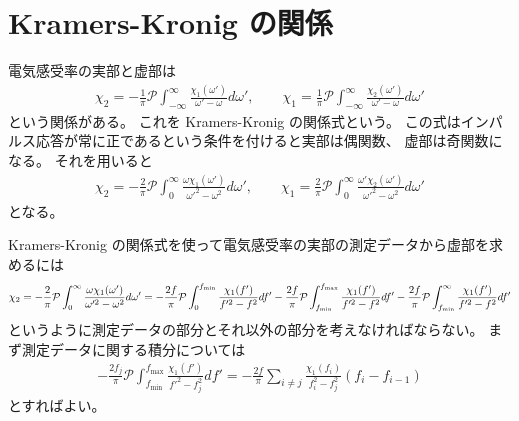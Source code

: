 \documentclass[9pt,dvipdfmx,a4paper]{jsarticle}
\begin{document}


\nocite{*}

\appendix
\section{Kramers-Kronig の関係}
電気感受率の実部と虚部は
\begin{align}
    \chi_2 = -\frac{1}{\pi}\mathcal{P}\int_{-\infty}^{\infty} \frac{\chi_1(\omega')}{\omega'-\omega} d\omega',\qquad
    \chi_1 =  \frac{1}{\pi}\mathcal{P}\int_{-\infty}^{\infty} \frac{\chi_2(\omega')}{\omega'-\omega} d\omega'
\end{align}
という関係がある。
これを Kramers-Kronig の関係式という。
この式はインパルス応答が常に正であるという条件を付けると実部は偶関数、
虚部は奇関数になる。
それを用いると
\begin{align}
    \chi_2 = -\frac{2}{\pi}\mathcal{P}\int_{0}^{\infty} \frac{\omega \chi_1(\omega')}{\omega'^2-\omega^2} d\omega',\qquad
    \chi_1 =  \frac{2}{\pi}\mathcal{P}\int_{0}^{\infty} \frac{\omega'\chi_2(\omega')}{\omega'^2-\omega^2} d\omega'
\end{align}
となる。

Kramers-Kronig の関係式を使って電気感受率の実部の測定データから虚部を求めるには
\begin{align}
    \chi_2
    = -\frac{2}{\pi}\mathcal{P}\int_{0}^{\infty} \frac{\omega \chi_1(\omega')}{\omega'^2-\omega^2} d\omega'\notag
    = -\frac{2f}{\pi}\mathcal{P}\int_{0}^{f_{\mathrm{min}}} \frac{\chi_1(f')}{f'^2-f^2} df'
       -\frac{2f}{\pi}\mathcal{P}\int_{f_\mathrm{min}}^{f_{\mathrm{max}}} \frac{\chi_1(f')}{f'^2-f^2} df'
       -\frac{2f}{\pi}\mathcal{P}\int_{f_\mathrm{min}}^{\infty} \frac{\chi_1(f')}{f'^2-f^2} df'
\end{align}
というように測定データの部分とそれ以外の部分を考えなければならない。
まず測定データに関する積分については
\begin{align}
-\frac{2f_j}{\pi}\mathcal{P}\int_{f_\mathrm{min}}^{f_{\mathrm{max}}} \frac{\chi_1(f')}{f'^2-f_j^2} df'
= -\frac{2f}{\pi}\sum_{i\neq j} \frac{\chi_1(f_i)}{f_i^2-f_j^2}(f_i-f_{i-1})
\end{align}
とすればよい。
\end{document}
